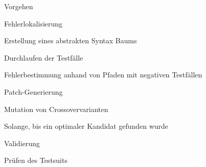 %
\begin{frame}{Vorgehen}
	\begin{itemizes}{1em}
		\item Fehlerlokalisierung
		\begin{itemizes}{0.5em}
			\item Erstellung eines abstrakten Syntax Baums
			\item Durchlaufen der Testfälle
			\item Fehlerbestimmung anhand von Pfaden mit negativen Testfällen
		\end{itemizes}
		\item Patch-Generierung
		\begin{itemizes}{0.5em}
			\item Mutation von Crossovervarianten
			\item Solange, bis ein optimaler Kandidat gefunden wurde
		\end{itemizes}
		\item Validierung
		\begin{itemizes}{0.5em}
			\item Prüfen des Testsuits
		\end{itemizes}
	\end{itemizes}
\end{frame}
%

%
%
%
%
%
%
%
%
%
%
%
%
%
%
%
%
%
%
